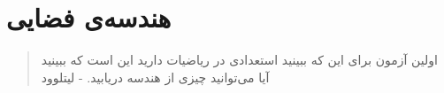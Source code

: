 \chapter{هندسه‌ی فضایی}
\thispagestyle{empty}

\begin{quote}
	{\lotus
		اولین آزمون برای این که ببینید استعدادی در ریاضیات دارید این است که ببینید آیا می‌توانید چیزی از هندسه دریابید. \quad - لیتلوود%
	}
\end{quote}
